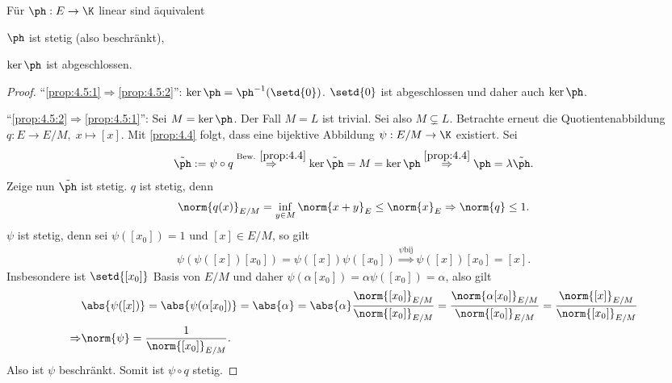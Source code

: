 \begin{prop}
\label{prop:4.5}
Für $\ph: E\to \K$ linear sind äquivalent
\begin{equivenum}
  \item\label{prop:4.5:1} $\ph$ ist stetig (also beschränkt),
  \item\label{prop:4.5:2} $\ker \ph$ ist abgeschlossen.
\end{equivenum}
\end{prop}

\begin{proof}
``\ref{prop:4.5:1}$\Rightarrow$\ref{prop:4.5:2}'': $\ker\ph =
\ph^{-1}(\setd{0})$. $\setd{0}$ ist abgeschlossen und daher auch $\ker\ph$.

``\ref{prop:4.5:2}$\Rightarrow$\ref{prop:4.5:1}'':
  Sei $M=\ker \ph$. Der Fall
$M=L$ ist trivial. Sei also $M\subsetneq L$. Betrachte  erneut die Quotientenabbildung $q: E\to
E/M,\; x\mapsto [x]$. Mit \ref{prop:4.4} folgt, dass eine bijektive Abbildung
$\psi: E/M\to \K$ existiert. Sei
\begin{align*}
\tilde{\ph} := \psi\circ q \overset{\text{Bew. }\ref{prop:4.4}}{\Rightarrow}
\ker \tilde{\ph} = M = \ker \ph \overset{\ref{prop:4.4}}{\Rightarrow} \ph =
\lambda\tilde{\ph}.
\end{align*}
Zeige nun $\tilde{\ph}$ ist stetig. $q$ ist stetig, denn
\begin{align*}
\norm{q(x)}_{E/M} = \inf\limits_{y\in M}\norm{x+y}_E \le \norm{x}_E \Rightarrow
\norm{q} \le 1.
\end{align*}
$\psi$ ist stetig, denn sei $\psi([x_0]) = 1$ und $[x]\in E/M$, so gilt
\begin{align*}
\psi(\psi([x])[x_0]) = \psi([x])\psi([x_0]) \overset{\psi\text{
bij}}{\Rightarrow} \psi([x])[x_0] = [x].
\end{align*}
Insbesondere ist $\setd{[x_0]}$ Basis von $E/M$ und daher $\psi(\alpha[x_0]) =
\alpha\psi([x_0]) =\alpha$, also gilt
\begin{align*}
&\abs{\psi([x])} = \abs{\psi(\alpha[x_0])} = \abs{\alpha} = 
\abs{\alpha}\frac{\norm{[x_0]}_{E/M}}{\norm{[x_0]}_{E/M}}
= \frac{\norm{\alpha[x_0]}_{E/M}}{\norm{[x_0]}_{E/M}}
= \frac{\norm{[x]}_{E/M}}{\norm{[x_0]}_{E/M}}\\
\Rightarrow& \norm{\psi} = \frac{1}{\norm{[x_0]}_{E/M}}.
\end{align*}
Also ist $\psi$ beschränkt. Somit ist $\psi\circ q$ stetig.


\end{proof}
